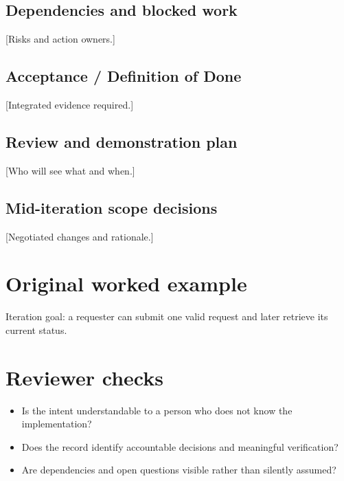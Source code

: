 \documentclass[11pt,letterpaper]{article}
\begin{document}
\subsection{Dependencies and blocked work}
[Risks and action owners.]

\subsection{Acceptance / Definition of Done}
[Integrated evidence required.]

\subsection{Review and demonstration plan}
[Who will see what and when.]

\subsection{Mid-iteration scope decisions}
[Negotiated changes and rationale.]

\section{Original worked example}
\begin{tcolorbox}[colback=tealback,colframe=navy,title={Illustrative entry},breakable]
Iteration goal: a requester can submit one valid request and later retrieve its current status.

\end{tcolorbox}
\section{Reviewer checks}
\begin{itemize}[leftmargin=*,itemsep=2pt]
\item Is the intent understandable to a person who does not know the implementation?
\item Does the record identify accountable decisions and meaningful verification?
\item Are dependencies and open questions visible rather than silently assumed?
\end{itemize}
\end{document}
